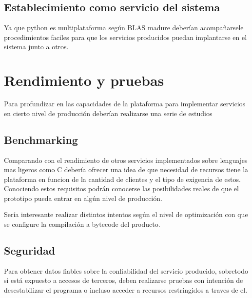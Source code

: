 \documentclass[a4paper,spanish,12pt]{book}
\begin{document}
\subsection{Establecimiento como servicio del sistema}
Ya que python es multiplataforma según BLAS madure deberían acompañarsele procedimientos faciles para que los servicios producidos puedan implantarse en el sistema junto a otros.
\section{Rendimiento y pruebas}
Para profundizar en las capacidades de la plataforma para implementar servicios en cierto nivel de producción deberían realizarse una serie de estudios
\subsection{Benchmarking}
Comparando con el rendimiento de otros servicios implementados sobre lenguajes mas ligeros como C debería ofrecer una idea de que necesidad de recursos tiene la plataforma en funcion de la cantidad de clientes y el tipo de exigencia de estos. Conociendo estos requisitos podrán conocerse las posibilidades reales de que el prototipo pueda entrar en algún nivel de producción.

Sería interesante realizar distintos intentos según el nivel de optimización con que se configure la compilación a bytecode del producto.


\subsection{Seguridad}
Para obtener datos fiables sobre la confiabilidad del servicio producido, sobretodo si está expuesto a accesos de terceros, deben realizarse pruebas con intención de desestabilizar el programa o incluso acceder a recursos restringidos a traves de el.
\end{document}
